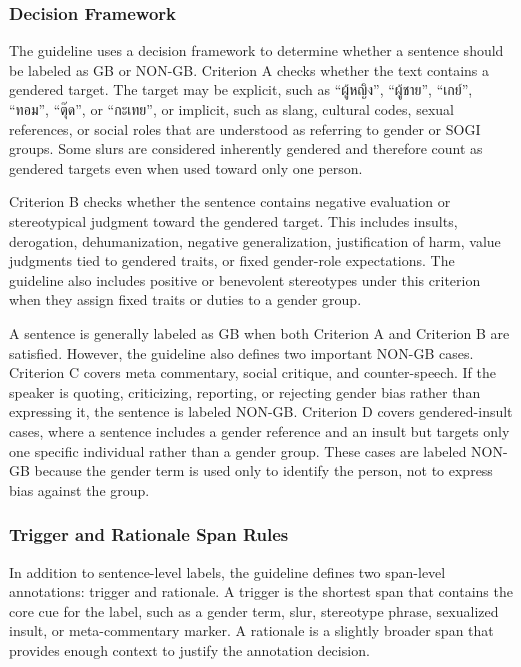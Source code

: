 \documentclass[12pt,oneside,openright,a4paper]{cpe-english-project}
\begin{document}
\subsubsection{Decision Framework}

The guideline uses a decision framework to determine whether a sentence should be labeled as GB or NON-GB. Criterion A checks whether the text contains a gendered target. The target may be explicit, such as “ผู้หญิง”, “ผู้ชาย”, “เกย์”, “ทอม”, “ตุ๊ด”, or “กะเทย”, or implicit, such as slang, cultural codes, sexual references, or social roles that are understood as referring to gender or SOGI groups. Some slurs are considered inherently gendered and therefore count as gendered targets even when used toward only one person.

Criterion B checks whether the sentence contains negative evaluation or stereotypical judgment toward the gendered target. This includes insults, derogation, dehumanization, negative generalization, justification of harm, value judgments tied to gendered traits, or fixed gender-role expectations. The guideline also includes positive or benevolent stereotypes under this criterion when they assign fixed traits or duties to a gender group.

A sentence is generally labeled as GB when both Criterion A and Criterion B are satisfied. However, the guideline also defines two important NON-GB cases. Criterion C covers meta commentary, social critique, and counter-speech. If the speaker is quoting, criticizing, reporting, or rejecting gender bias rather than expressing it, the sentence is labeled NON-GB. Criterion D covers gendered-insult cases, where a sentence includes a gender reference and an insult but targets only one specific individual rather than a gender group. These cases are labeled NON-GB because the gender term is used only to identify the person, not to express bias against the group.

\subsubsection{Trigger and Rationale Span Rules}

In addition to sentence-level labels, the guideline defines two span-level annotations: trigger and rationale. A trigger is the shortest span that contains the core cue for the label, such as a gender term, slur, stereotype phrase, sexualized insult, or meta-commentary marker. A rationale is a slightly broader span that provides enough context to justify the annotation decision.
\end{document}
